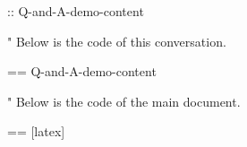 \documentclass[%
  use theme = ChatGPT-light,
  scroll,
]{Q-and-A}
\begin{document}
:: {Q-and-A-demo-content}

"
  Below is the code of this conversation.

  == {Q-and-A-demo-content}

"
  Below is the code of the main document.

  == [latex] {\jobname}
\end{document}
